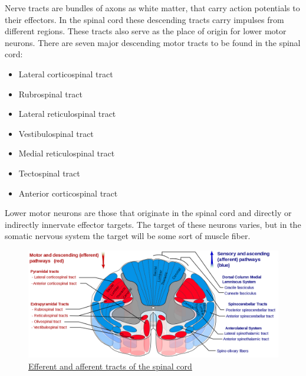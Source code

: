 Nerve tracts are bundles of axons as white matter, that carry action potentials to their effectors. In the spinal cord these descending tracts carry impulses from different regions. These tracts also serve as the place of origin for lower motor neurons. There are seven major descending motor tracts to be found in the spinal cord:

\begin{itemize}
\tightlist
\item
  Lateral corticospinal tract
\item
  Rubrospinal tract
\item
  Lateral reticulospinal tract
\item
  Vestibulospinal tract
\item
  Medial reticulospinal tract
\item
  Tectospinal tract
\item
  Anterior corticospinal tract
\end{itemize}

Lower motor neurons are those that originate in the spinal cord and directly or indirectly innervate effector targets. The target of these neurons varies, but in the somatic nervous system the target will be some sort of muscle fiber.



\begin{figure}

{\centering \includegraphics[width=0.7\linewidth]{./figures/cns/Spinal_cord_tracts_-_English} 

}

\caption{\href{https://commons.wikimedia.org/wiki/File:Spinal_cord_tracts_-_English.svg}{Efferent and afferent tracts of the spinal cord}}\label{fig:spinaltracts}
\end{figure}

